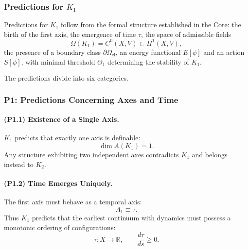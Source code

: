 

\subsubsection{Predictions for \texorpdfstring{$K_1$}{K_1}}
\label{sec:predictions-k1}

Predictions for $K_1$ follow from the formal structure established in the
Core: the birth of the first axis, the emergence of time $\tau$, the space
of admissible fields
\[
\Omega(K_1) = C^0(X,V) \subset H^1(X,V),
\]
the presence of a boundary class $\partial\Omega_{\mathrm{cl}}$, an energy
functional $E[\phi]$ and an action $S[\phi]$, with minimal threshold
$\Theta_1$ determining the stability of $K_1$.

The predictions divide into six categories.

\subsubsection{P1: Predictions Concerning Axes and Time}

\paragraph{(P1.1) Existence of a Single Axis.}
$K_1$ predicts that exactly one axis is definable:
\[
\dim A(K_1) = 1.
\]
Any structure exhibiting two independent axes contradicts $K_1$ and belongs
instead to $K_2$.

\paragraph{(P1.2) Time Emerges Uniquely.}
The first axis must behave as a temporal axis:
\[
A_1 \equiv \tau.
\]
Thus $K_1$ predicts that the earliest continuum with dynamics must possess
a monotonic ordering of configurations:
\[
\tau: X \to \mathbb{R}, \qquad \frac{d\tau}{ds} \ge 0.
\]

